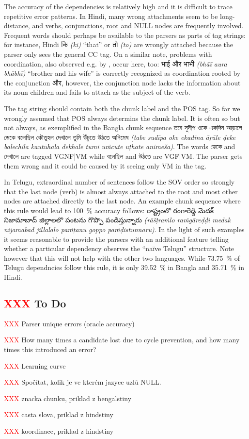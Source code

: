 \documentclass[11pt]{article}
\newcommand{\hi}[1]{{\hifont #1}}
\newcommand{\bn}[1]{{\bnfont #1}}
\newcommand{\te}[1]{{\tefont #1}}
\newcommand{\translit}[1]{{\translitfont \textit{(#1)}}}
\newcommand{\XXX}{\textcolor{red}{XXX }} %
\begin{document}
The accuracy of the dependencies is relatively high and it is difficult to trace repetitive error patterns. In Hindi, many wrong attachments seem to be long-distance, and verbs, conjunctions, root and NULL nodes are frequently involved. Frequent words should perhaps be available to the parsers as parts of tag strings: for instance, Hindi \hi{कि} \translit{ki} ``that'' or \hi{तो} \translit{to} are wrongly attached because the parser only sees the general CC tag. On a similar note, problems with coordination, also observed e.g. by \citet{dzparser}, occur here, too: \hi{भाई और भाभी} \translit{bhāī aura bhābhī} ``brother and his wife'' is correctly recognized as coordination rooted by the conjunction \hi{और}, however, the conjunction node lacks the information about its noun children and fails to attach as the subject of the verb.

The tag string should contain both the chunk label and the POS tag. So far we wrongly assumed that POS always determins the chunk label. It is often so but not always, as exemplified in the Bangla chunk sequence \bn{তবে সুদীপ ওকে একদিন আড়ালে ডেকে বলেছিল কৌতূহল দেখালে তুমি উঁচুতে উঠতে অনিমেষ} \translit{tabe sudīpa oke ekadina āṛāle ḍeke balechila kautūhala dekhāle tumi um̃cute uṭhate animeša}. The words \bn{ডেকে} and \bn{দেখালে} are tagged VGNF|VM while \bn{বলেছিল} and \bn{উঠতে} are VGF|VM. The parser gets them wrong and it could be caused by it seeing only VM in the tag.

In Telugu, extraordinal number of sentences follow the SOV order so strongly that the last node (verb) is almost always attached to the root and most other nodes are attached directly to the last node. An example chunk sequence where this rule would lead to 100~\% accuracy follows: \te{రాష్ట్రంలొ రంగారెడ్డి మెదక్ నిజామాబాద్ జిల్లాలలొ పంటను గొప్పొ పండిస్తున్నారు} \translit{rāšṭraṁlo raṁgāreḍḍi medak nijāmābād jillālalo paṁṭanu goppo paṁḍistunnāru}. In the light of such examples it seems reasonable to provide the parsers with an additional feature telling whether a particular dependency observes the ``naïve Telugu'' structure. Note however that this will not help with the other two languages. While 73.75~\% of Telugu dependncies follow this rule, it is only 39.52~\% in Bangla and 35.71~\% in Hindi.

\subsection{\XXX To Do}
\begin{compactitem}
\item \XXX Parser unique errors (oracle accuracy)
\item \XXX How many times a candidate lost due to cycle prevention, and how many times this introduced an error?
\item \XXX Learning curve
\item \XXX Spočítat, kolik je ve kterém jazyce uzlů NULL.
\item \XXX znacka chunku, priklad z bengalstiny
\item \XXX casta slova, priklad z hindstiny
\item \XXX koordinace, priklad z hindstiny
\end{compactitem}
\end{document}
